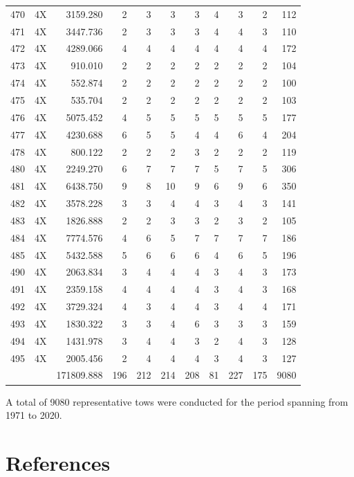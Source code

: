 \documentclass[12pt]{article}\usepackage[]{graphicx}\usepackage[]{color}
\begin{document}
\begin{landscape}
\begin{longtable}[t]{crrrrrrrrrr}
470 & 4X & 3159.280 & 2 & 3 & 3 & 3 & 4 & 3 & 2 & 112\\
471 & 4X & 3447.736 & 2 & 3 & 3 & 3 & 4 & 4 & 3 & 110\\
472 & 4X & 4289.066 & 4 & 4 & 4 & 4 & 4 & 4 & 4 & 172\\
473 & 4X & 910.010 & 2 & 2 & 2 & 2 & 2 & 2 & 2 & 104\\
474 & 4X & 552.874 & 2 & 2 & 2 & 2 & 2 & 2 & 2 & 100\\
475 & 4X & 535.704 & 2 & 2 & 2 & 2 & 2 & 2 & 2 & 103\\
476 & 4X & 5075.452 & 4 & 5 & 5 & 5 & 5 & 5 & 5 & 177\\
477 & 4X & 4230.688 & 6 & 5 & 5 & 4 & 4 & 6 & 4 & 204\\
478 & 4X & 800.122 & 2 & 2 & 2 & 3 & 2 & 2 & 2 & 119\\
480 & 4X & 2249.270 & 6 & 7 & 7 & 7 & 5 & 7 & 5 & 306\\
481 & 4X & 6438.750 & 9 & 8 & 10 & 9 & 6 & 9 & 6 & 350\\
482 & 4X & 3578.228 & 3 & 3 & 4 & 4 & 3 & 4 & 3 & 141\\
483 & 4X & 1826.888 & 2 & 2 & 3 & 3 & 2 & 3 & 2 & 105\\
484 & 4X & 7774.576 & 4 & 6 & 5 & 7 & 7 & 7 & 7 & 186\\
485 & 4X & 5432.588 & 5 & 6 & 6 & 6 & 4 & 6 & 5 & 196\\
490 & 4X & 2063.834 & 3 & 4 & 4 & 4 & 3 & 4 & 3 & 173\\
491 & 4X & 2359.158 & 4 & 4 & 4 & 4 & 3 & 4 & 3 & 168\\
492 & 4X & 3729.324 & 4 & 3 & 4 & 4 & 3 & 4 & 4 & 171\\
493 & 4X & 1830.322 & 3 & 3 & 4 & 6 & 3 & 3 & 3 & 159\\
494 & 4X & 1431.978 & 3 & 4 & 4 & 3 & 2 & 4 & 3 & 128\\
495 & 4X & 2005.456 & 2 & 4 & 4 & 4 & 3 & 4 & 3 & 127\\
 &  & 171809.888 & 196 & 212 & 214 & 208 & 81 & 227 & 175 & 9080\\*
\end{longtable}
\end{landscape}
\endgroup{}

A total of 9080 representative tows were conducted for the period spanning from 1971 to 2020.

\clearpage

\hypertarget{references}{%
\section{References}\label{references}}
\end{document}
